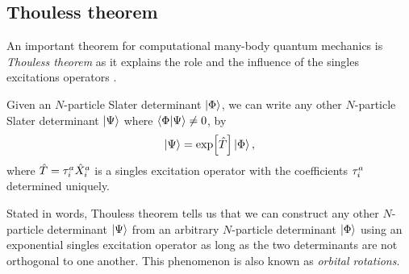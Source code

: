         \subsection{Thouless theorem}
            An important theorem for computational many-body quantum mechanics
            is \emph{Thouless theorem} as it explains the role and the
            influence of the singles excitations operators
            \cite{thouless1960225}.
            \begin{theorem}
                Given an $N$-particle Slater determinant $\ket{\Phi}$, we can
                write any other $N$-particle Slater determinant $\ket{\Psi}$
                where $\braket{\Phi}{\Psi} \neq 0$, by
                \begin{align}
                    \ket{\Psi}
                    = \exp[\hat{T}]\ket{\Phi},
                \end{align}
                where $\hat{T} = \tau^{a}_{i}\hat{X}^{a}_{i}$ is a singles
                excitation operator with the coefficients $\tau^{a}_{i}$
                determined uniquely.
            \end{theorem}
            Stated in words, Thouless theorem tells us that we can construct any
            other $N$-particle determinant $\ket{\Psi}$ from an arbitrary
            $N$-particle determinant $\ket{\Phi}$ using an exponential singles
            excitation operator as long as the two determinants are not
            orthogonal to one another.
            This phenomenon is also known as \emph{orbital rotations}.

